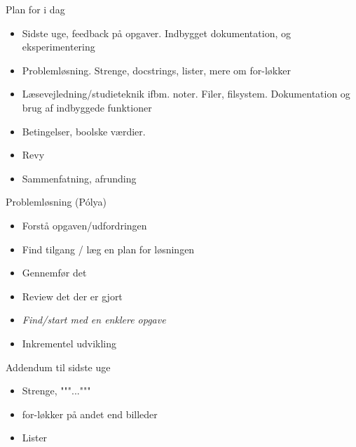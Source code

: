 \documentclass[a4paper,landscape]{slides}
\begin{document}
\begin{slide}
	\begin{center} {\large 
            Plan for i dag
	} \end{center}
	\begin{itemize} \addtolength{\itemsep}{-\baselineskip}
    		\item Sidste uge, feedback på opgaver. Indbygget dokumentation, og eksperimentering
    		\item Problemløsning. Strenge, docstrings, lister, mere om for-løkker
    		\item Læsevejledning/studieteknik ifbm. noter. Filer, filsystem. Dokumentation og brug af indbyggede funktioner
    		\item Betingelser, boolske værdier.
    		\item Revy
    		\item Sammenfatning, afrunding
	\end{itemize}
\end{slide}


\begin{slide}
	\begin{center} {\large 
            Problemløsning (Pólya)
	} \end{center}
	\begin{itemize} \addtolength{\itemsep}{-\baselineskip}
		\item Forstå opgaven/udfordringen
		\item Find tilgang / læg en plan for løsningen
		\item Gennemfør det
		\item Review det der er gjort
		\item \emph{Find/start med en enklere opgave}
                \item Inkrementel udvikling
	\end{itemize}
\end{slide}

\begin{slide}
	\begin{center} {\large 
            Addendum til sidste uge
	} \end{center}
	\begin{itemize} \addtolength{\itemsep}{-\baselineskip}
            \item Strenge, """..."""
            \item for-løkker på andet end billeder
            \item Lister
	\end{itemize}
\end{slide}
\end{document}
